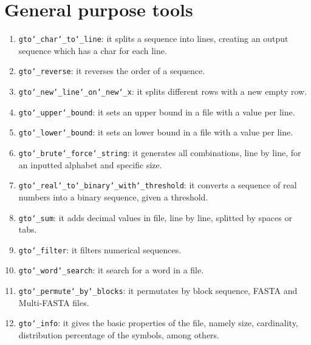 \chapter{General purpose tools}
\label{seq}

\begin{enumerate}

\item \texttt{gto\char`_char\char`_to\char`_line}: it splits a sequence into lines, creating an output sequence which has a char for each line.

\item \texttt{gto\char`_reverse}: it reverses the order of a sequence.

\item \texttt{gto\char`_new\char`_line\char`_on\char`_new\char`_x}: it splits different rows with a new empty row.

\item \texttt{gto\char`_upper\char`_bound}: it sets an upper bound in a file with a value per line.

\item \texttt{gto\char`_lower\char`_bound}: it sets an lower bound in a file with a value per line.

\item \texttt{gto\char`_brute\char`_force\char`_string}: it generates all combinations, line by line, for an inputted alphabet and specific size.

\item \texttt{gto\char`_real\char`_to\char`_binary\char`_with\char`_threshold}: it converts a sequence of real numbers into a binary sequence, given a threshold.

\item \texttt{gto\char`_sum}: it adds decimal values in file, line by line, splitted by spaces or tabs.

\item \texttt{gto\char`_filter}: it filters numerical sequences.

\item \texttt{gto\char`_word\char`_search}: it search for a word in a file.

\item \texttt{gto\char`_permute\char`_by\char`_blocks}: it permutates by block sequence, FASTA and Multi-FASTA files. 

\item \texttt{gto\char`_info}: it gives the basic properties of the file, namely size, cardinality, distribution percentage of the symbols, among others.


\end{enumerate}
